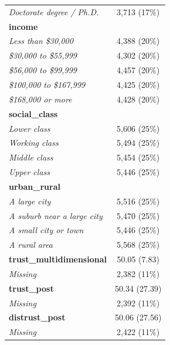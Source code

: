 \documentclass[
  letterpaper,
  DIV=11,
  numbers=noendperiod]{scrartcl}
\begin{document}
\begin{longtable}{lc}
\hspace{1em}\em{Doctorate degree / Ph.D.} & 3,713 (17\%)\\
\textbf{income} & \\
\hspace{1em}\em{Less than \$30,000} & 4,388 (20\%)\\
\addlinespace
\hspace{1em}\em{\$30,000 to \$55,999} & 4,302 (20\%)\\
\hspace{1em}\em{\$56,000 to \$99,999} & 4,457 (20\%)\\
\hspace{1em}\em{\$100,000 to \$167,999} & 4,425 (20\%)\\
\hspace{1em}\em{\$168,000 or more} & 4,428 (20\%)\\
\textbf{social\_class} & \\
\addlinespace
\hspace{1em}\em{Lower class} & 5,606 (25\%)\\
\hspace{1em}\em{Working class} & 5,494 (25\%)\\
\hspace{1em}\em{Middle class} & 5,454 (25\%)\\
\hspace{1em}\em{Upper class} & 5,446 (25\%)\\
\textbf{urban\_rural} & \\
\addlinespace
\hspace{1em}\em{A large city} & 5,516 (25\%)\\
\hspace{1em}\em{A suburb near a large city} & 5,470 (25\%)\\
\hspace{1em}\em{A small city or town} & 5,446 (25\%)\\
\hspace{1em}\em{A rural area} & 5,568 (25\%)\\
\textbf{trust\_multidimensional} & 50.05 (7.83)\\
\addlinespace
\hspace{1em}\em{Missing} & 2,382 (11\%)\\
\textbf{trust\_post} & 50.34 (27.39)\\
\hspace{1em}\em{Missing} & 2,392 (11\%)\\
\textbf{distrust\_post} & 50.06 (27.56)\\
\hspace{1em}\em{Missing} & 2,422 (11\%)\\

\end{longtable}
\end{document}
